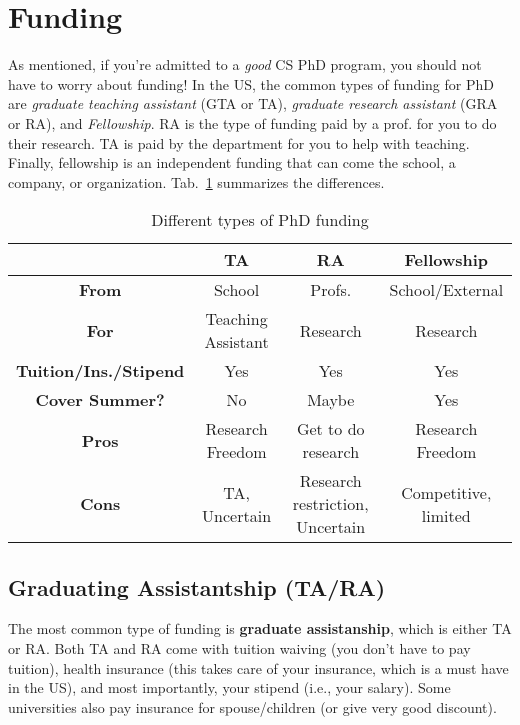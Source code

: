 \documentclass[10pt]{article}
\begin{document}
\section{Funding}\label{sec:funding}

As mentioned, if you're admitted to a \emph{good} CS PhD program, you should not have to worry about funding!  
In the US, the common types of funding for PhD are \emph{graduate teaching assistant} (GTA or TA), \emph{graduate research assistant} (GRA or RA), and \emph{Fellowship}.
RA is the type of funding paid by a prof. for you to do their research. TA is paid by the department for you to help with teaching. Finally, fellowship is an independent funding that can come the school, a company, or organization. Tab.~\ref{tab:funding} summarizes the differences. 

\begin{table}
  \centering
  \caption{Different types of PhD funding}\label{tab:funding}
  \begin{tabular}{c|c|c|c}
    \toprule
    &\textbf{TA}&\textbf{RA}&\textbf{Fellowship}\\
    \midrule
    \textbf{From} & School & Profs. & School/External\\
    \textbf{For}                  & Teaching Assistant       & Research                        & Research                              \\
    \textbf{Tuition/Ins./Stipend} & Yes                      & Yes                             & Yes                                   \\
    \textbf{Cover Summer?}              & No                       & Maybe                           & Yes                                   \\
    \midrule
    \textbf{Pros}                 & Research Freedom         & Get to do research              & Research Freedom                      \\
    \textbf{Cons}                 & TA, Uncertain            & Research restriction, Uncertain & Competitive, limited             \\
    \bottomrule
  \end{tabular}
\end{table}

\subsection{Graduating Assistantship (TA/RA)}
The most common type of funding is \textbf{graduate assistanship}, which is either TA or RA. Both TA and RA come with tuition waiving (you don't have to pay tuition), health insurance (this takes care of your insurance, which is a must have in the US), and most importantly, your stipend (i.e., your salary). Some universities also pay insurance for spouse/children (or give very good discount).
\end{document}
